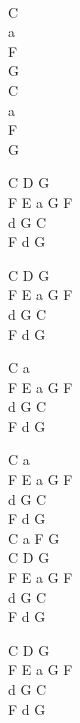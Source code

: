 \begin{chord}
[Recytacja]\\
C\\
a\\
F\\
G\\
C\\
a\\
F\\
G

C D G\\
F E a G F\\
d G C\\
F d G

C D G\\
F E a G F\\
d G C\\
F d G

C a\\
F E a G F\\
d G C\\
F d G

C a\\
F E a G F\\
d G C\\
F d G\\
C a F G\\
C D G\\
F E a G F\\
d G C\\
F d G

C D G\\
F E a G F\\
d G C\\
F d G
\end{chord}
